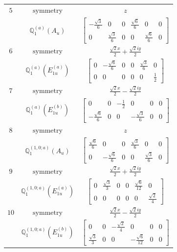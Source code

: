 \documentclass[fleqn,8pt,landscape]{jsarticle}
\begin{document}
\begin{longtable}{ccc}
$ 5 $ & $ \text{symmetry} $ & $ z $ \\
$  $ & $ \mathbb{Q}_{1}^{(a)}(A_{u}) $ & $ \begin{bmatrix} - \frac{\sqrt{3}}{6} & 0 & 0 & \frac{\sqrt{6}}{6} & 0 & 0 \\ 0 & \frac{\sqrt{3}}{6} & 0 & 0 & \frac{\sqrt{6}}{6} & 0 \end{bmatrix} $ \\ \hline
$ 6 $ & $ \text{symmetry} $ & $ \frac{\sqrt{2} x}{2} + \frac{\sqrt{2} i y}{2} $ \\
$  $ & $ \mathbb{Q}_{1}^{(a)}(E_{1u}^{(a)}) $ & $ \begin{bmatrix} 0 & - \frac{\sqrt{6}}{6} & 0 & 0 & \frac{\sqrt{3}}{6} & 0 \\ 0 & 0 & 0 & 0 & 0 & \frac{1}{2} \end{bmatrix} $ \\ \hline
$ 7 $ & $ \text{symmetry} $ & $ \frac{\sqrt{2} x}{2} - \frac{\sqrt{2} i y}{2} $ \\
$  $ & $ \mathbb{Q}_{1}^{(a)}(E_{1u}^{(b)}) $ & $ \begin{bmatrix} 0 & 0 & - \frac{1}{2} & 0 & 0 & 0 \\ - \frac{\sqrt{6}}{6} & 0 & 0 & - \frac{\sqrt{3}}{6} & 0 & 0 \end{bmatrix} $ \\ \hline
$ 8 $ & $ \text{symmetry} $ & $ z $ \\
$  $ & $ \mathbb{Q}_{1}^{(1,0;a)}(A_{u}) $ & $ \begin{bmatrix} \frac{\sqrt{6}}{6} & 0 & 0 & \frac{\sqrt{3}}{6} & 0 & 0 \\ 0 & - \frac{\sqrt{6}}{6} & 0 & 0 & \frac{\sqrt{3}}{6} & 0 \end{bmatrix} $ \\ \hline
$ 9 $ & $ \text{symmetry} $ & $ \frac{\sqrt{2} x}{2} + \frac{\sqrt{2} i y}{2} $ \\
$  $ & $ \mathbb{Q}_{1}^{(1,0;a)}(E_{1u}^{(a)}) $ & $ \begin{bmatrix} 0 & \frac{\sqrt{3}}{3} & 0 & 0 & \frac{\sqrt{6}}{12} & 0 \\ 0 & 0 & 0 & 0 & 0 & \frac{\sqrt{2}}{4} \end{bmatrix} $ \\ \hline
$ 10 $ & $ \text{symmetry} $ & $ \frac{\sqrt{2} x}{2} - \frac{\sqrt{2} i y}{2} $ \\
$  $ & $ \mathbb{Q}_{1}^{(1,0;a)}(E_{1u}^{(b)}) $ & $ \begin{bmatrix} 0 & 0 & - \frac{\sqrt{2}}{4} & 0 & 0 & 0 \\ \frac{\sqrt{3}}{3} & 0 & 0 & - \frac{\sqrt{6}}{12} & 0 & 0 \end{bmatrix} $ \\ \hline

\end{longtable}
\end{document}
